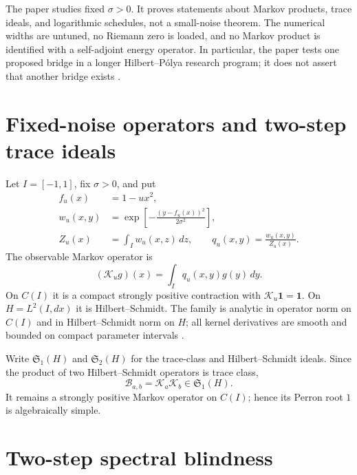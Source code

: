 \documentclass[11pt]{article}
\theoremstyle{definition}
\theoremstyle{remark}
\newcommand{\cK}{\mathcal K}
\newcommand{\cB}{\mathcal B}
\newcommand{\one}{\mathbf 1}
\begin{document}
The paper studies fixed $\sigma>0$.  It proves statements about Markov
products, trace ideals, and logarithmic schedules, not a small-noise theorem.
The numerical widths are untuned, no Riemann zero is loaded, and no Markov
product is identified with a self-adjoint energy operator.  In particular,
the paper tests one proposed bridge in a longer Hilbert--P\'olya research
program; it does not assert that another bridge exists
\citep{BerryKeating1999}.

\section{Fixed-noise operators and two-step trace ideals}
\label{sec:operators}

Let $I=[-1,1]$, fix $\sigma>0$, and put
\begin{align}
 f_u(x)&=1-u x^2,\label{eq:map}\\
 w_u(x,y)&=\exp\left[-\frac{(y-f_u(x))^2}{2\sigma^2}\right],\\
 Z_u(x)&=\int_Iw_u(x,z)\,dz,
 \qquad q_u(x,y)=\frac{w_u(x,y)}{Z_u(x)}.\label{eq:kernel}
\end{align}
The observable Markov operator is
\begin{equation}\label{eq:operator}
 (\cK_u g)(x)=\int_Iq_u(x,y)g(y)\,dy.
\end{equation}
On $C(I)$ it is a compact strongly positive contraction with
$\cK_u\one=\one$.  On $H=L^2(I,dx)$ it is Hilbert--Schmidt.  The family is
analytic in operator norm on $C(I)$ and in Hilbert--Schmidt norm on $H$; all
kernel derivatives are smooth and bounded on compact parameter intervals
\citep{Kress2014,WangContinuum2026}.

Write $\mathfrak S_1(H)$ and $\mathfrak S_2(H)$ for the trace-class and
Hilbert--Schmidt ideals.  Since the product of two Hilbert--Schmidt operators
is trace class,
\begin{equation}\label{eq:block}
 \cB_{a,b}=\cK_a\cK_b\in\mathfrak S_1(H).
\end{equation}
It remains a strongly positive Markov operator on $C(I)$; hence its Perron
root $1$ is algebraically simple.

\section{Two-step spectral blindness}
\label{sec:blindness}
\end{document}
